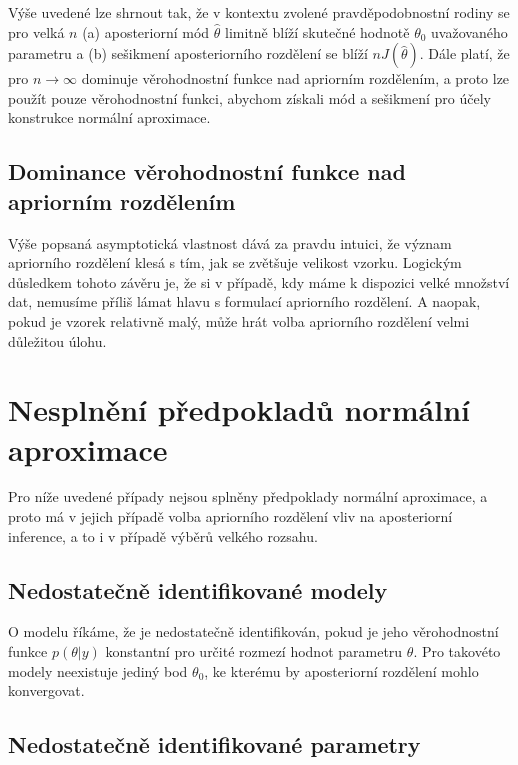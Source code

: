 Výše uvedené lze shrnout tak, že v kontextu zvolené pravděpodobnostní rodiny se pro velká $n$ (a) aposteriorní mód $\hat{\theta}$ limitně blíží skutečné hodnotě $\theta_0$ uvažovaného parametru a (b) sešikmení aposteriorního rozdělení se blíží $nJ(\hat{\theta})$. Dále platí, že pro $n \rightarrow \infty$ dominuje věrohodnostní funkce nad apriorním rozdělením, a proto lze použít pouze věrohodnostní funkci, abychom získali mód a sešikmení pro účely konstrukce normální aproximace.

\subsection{Dominance věrohodnostní funkce nad apriorním rozdělením}

Výše popsaná asymptotická vlastnost dává za pravdu intuici, že význam apriorního rozdělení klesá s tím, jak se zvětšuje velikost vzorku. Logickým důsledkem tohoto závěru je, že si v případě, kdy máme k dispozici velké množství dat, nemusíme příliš lámat hlavu s formulací apriorního rozdělení. A naopak, pokud je vzorek relativně malý, může hrát volba apriorního rozdělení velmi důležitou úlohu.

\section{Nesplnění předpokladů normální aproximace}

Pro níže uvedené případy nejsou splněny předpoklady normální aproximace, a proto má v jejich případě volba apriorního rozdělení vliv na aposteriorní inference, a to i v případě výběrů velkého rozsahu.

\subsection{Nedostatečně identifikované modely}

O modelu říkáme, že je nedostatečně identifikován, pokud je jeho věrohodnostní funkce $p(\theta|y)$ konstantní pro určité rozmezí hodnot parametru $\theta$. Pro takovéto modely neexistuje jediný bod $\theta_0$, ke kterému by aposteriorní rozdělení mohlo konvergovat.

\subsection{Nedostatečně identifikované parametry}

